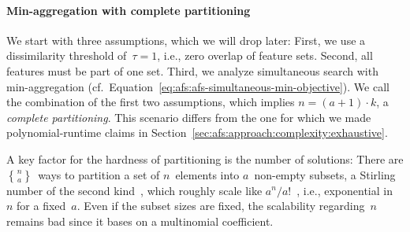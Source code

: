 \documentclass{article}
\theoremstyle{definition}
\newcommand{\stirling}[2]{\genfrac\{\}{0pt}{}{#1}{#2}} %
\begin{document}
\paragraph{Min-aggregation with complete partitioning}

We start with three assumptions, which we will drop later:
First, we use a dissimilarity threshold of~$\tau = 1$, i.e., zero overlap of feature sets.
Second, all features must be part of one set.
Third, we analyze simultaneous search with min-aggregation (cf.~Equation~\ref{eq:afs:afs-simultaneous-min-objective}).
We call the combination of the first two assumptions, which implies $n = (a+1) \cdot k$, a \emph{complete partitioning}.
This scenario differs from the one for which we made polynomial-runtime claims in Section~\ref{sec:afs:approach:complexity:exhaustive}.

A key factor for the hardness of partitioning is the number of solutions:
There are $\stirling{n}{a}$~ways to partition a set of $n$~elements into $a$~non-empty subsets, a Stirling number of the second kind~\cite{graham1994concrete}, which roughly scale like $a^n / a!$~\cite{moser1958stirling}, i.e., exponential in~$n$ for a fixed~$a$.
Even if the subset sizes are fixed, the scalability regarding~$n$ remains bad since it bases on a multinomial coefficient.
\end{document}
